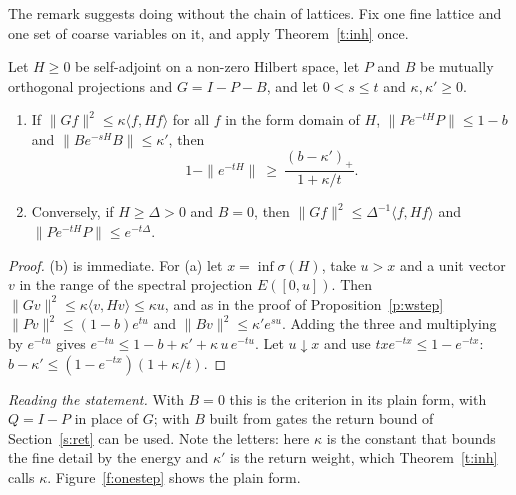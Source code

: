 The remark suggests doing without the chain of lattices. Fix one fine lattice and one set of coarse
variables on it, and apply Theorem~\ref{t:inh} once.

\begin{proposition}\label{p:onestep}
Let $H\ge0$ be self-adjoint on a non-zero Hilbert space, let $P$ and $B$ be mutually orthogonal projections
and $G=I-P-B$, and let $0<s\le t$ and $\kappa,\kappa'\ge0$.
\begin{enumerate}
\item[(a)] If $\|Gf\|^2\le\kappa\langle f,Hf\rangle$ for all $f$ in the form domain of $H$,
$\|Pe^{-tH}P\|\le1-b$ and $\|Be^{-sH}B\|\le\kappa'$, then
\[
1-\|e^{-tH}\|\ \ge\ \frac{(b-\kappa')_+}{1+\kappa/t}.
\]
\item[(b)] Conversely, if $H\ge\Delta>0$ and $B=0$, then $\|Gf\|^2\le\Delta^{-1}\langle f,Hf\rangle$ and
$\|Pe^{-tH}P\|\le e^{-t\Delta}$.
\end{enumerate}
\end{proposition}
\begin{proof}
(b) is immediate. For (a) let $x=\inf\sigma(H)$, take $u>x$ and a unit vector $v$ in the range of the
spectral projection $E([0,u])$. Then $\|Gv\|^2\le\kappa\langle v,Hv\rangle\le\kappa u$, and as in the proof
of Proposition~\ref{p:wstep} $\|Pv\|^2\le(1-b)e^{tu}$ and $\|Bv\|^2\le\kappa'e^{su}$. Adding the three and
multiplying by $e^{-tu}$ gives $e^{-tu}\le1-b+\kappa'+\kappa\,u\,e^{-tu}$. Let $u\downarrow x$ and use
$txe^{-tx}\le1-e^{-tx}$: $b-\kappa'\le(1-e^{-tx})(1+\kappa/t)$.
\end{proof}

\emph{Reading the statement.} With $B=0$ this is the criterion in its plain form, with $Q=I-P$ in place of
$G$; with $B$ built from gates the return bound of Section~\ref{s:ret} can be used. Note the letters: here
$\kappa$ is the constant that bounds the fine detail by the energy and $\kappa'$ is the return weight, which
Theorem~\ref{t:inh} calls $\kappa$. Figure~\ref{f:onestep} shows the plain form.

